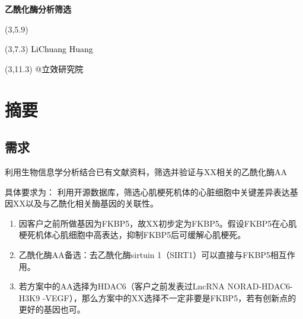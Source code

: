 \documentclass[
]{article}
\author{}
\date{\vspace{-2.5em}}
\providecommand{\tightlist}{%
  \setlength{\itemsep}{0pt}\setlength{\parskip}{0pt}}
\begin{document}
\begin{titlepage} 
\begin{center} \textbf{\Huge 乙酰化酶分析筛选}
\vspace{4em} \begin{textblock}{10}(3,5.9) \huge
\textbf{\textcolor{white}{2024-04-16}}
\end{textblock} \begin{textblock}{10}(3,7.3)
\Large \textcolor{black}{LiChuang Huang}
\end{textblock} \begin{textblock}{10}(3,11.3)
\Large \textcolor{black}{@立效研究院}
\end{textblock} \end{center} \end{titlepage}
\restoregeometry


\tableofcontents

\listoffigures

\listoftables

\newpage


\hypertarget{abstract}{%
\section{摘要}\label{abstract}}

\hypertarget{ux9700ux6c42}{%
\subsection{需求}\label{ux9700ux6c42}}

利用生物信息学分析结合已有文献资料，筛选并验证与XX相关的乙酰化酶AA

具体要求为： 利用开源数据库，筛选心肌梗死机体的心脏细胞中关键差异表达基因XX以及与乙酰化相关酶基因的关联性。

\begin{enumerate}
\def\labelenumi{\arabic{enumi}.}
\tightlist
\item
  因客户之前所做基因为FKBP5，故XX初步定为FKBP5。假设FKBP5在心肌梗死机体心肌细胞中高表达，抑制FKBP5后可缓解心肌梗死。
\item
  乙酰化酶AA备选：去乙酰化酶sirtuin 1（SIRT1）可以直接与FKBP5相互作用。
\item
  若方案中的AA选择为HDAC6（客户之前发表过LncRNA NORAD-HDAC6-H3K9 -VEGF），那么方案中的XX选择不一定非要是FKBP5，若有创新点的更好的基因也可。
\end{enumerate}
\end{document}
